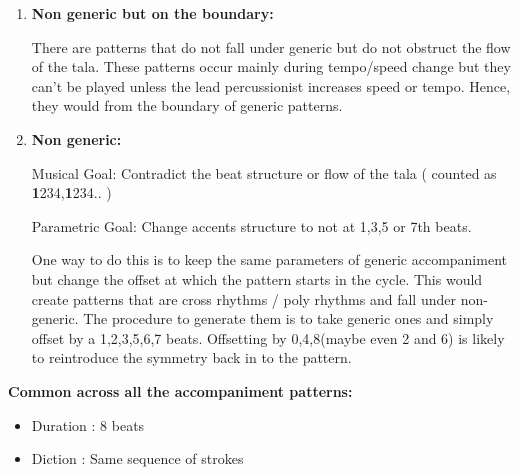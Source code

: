 \begin{enumerate}
\item \textbf{Non generic but on the boundary:}

There are patterns that do not fall under generic but do not obstruct the flow of the tala. These patterns occur mainly during tempo/speed change but they can't be played unless the lead percussionist increases speed or tempo. Hence, they would from the boundary of generic patterns.

\item \textbf{Non generic:}

Musical Goal: Contradict the beat structure or flow of the tala ( counted as \textbf{1}234,\textbf{1}234.. )

Parametric Goal: Change accents structure to not at 1,3,5 or 7th beats.

One way to do this is to keep the same parameters of generic accompaniment but change the offset at which the pattern starts in the cycle. This would create patterns that are cross rhythms / poly rhythms and fall under non-generic. The procedure to generate them is to take generic ones and simply offset by a 1,2,3,5,6,7 beats. Offsetting by 0,4,8(maybe even 2 and 6) is likely to reintroduce the symmetry back in to the pattern. 

\end{enumerate}


\textbf{ Common across all the accompaniment patterns:}

\begin{itemize}
\item Duration : 8 beats
\item Diction : Same sequence of strokes
\end{itemize}
